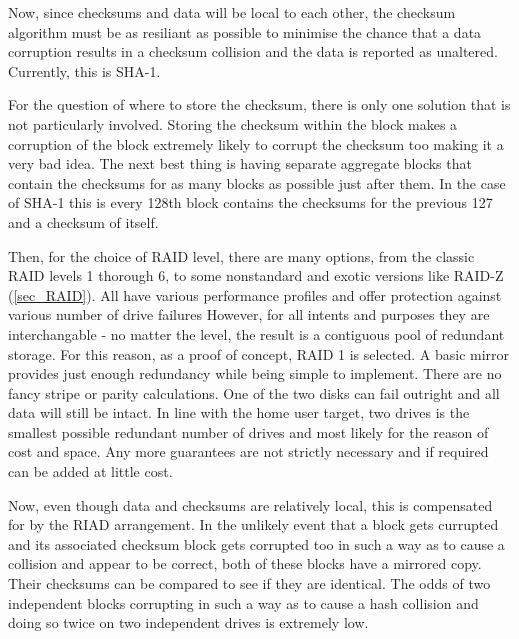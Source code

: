         Now, since checksums and data will be local to each other, the checksum
        algorithm must be as resiliant as possible to minimise the chance that
        a data corruption results in a checksum collision and the data is
        reported as unaltered. Currently, this is SHA-1.

        For the question of where to store the checksum, there is only one
        solution that is not particularly involved. Storing the checksum within
        the block makes a corruption of the block extremely likely to corrupt
        the checksum too making it a very bad idea. The next best thing is
        having separate aggregate blocks that contain the checksums for as many
        blocks as possible just after them. In the case of SHA-1 this is every
        128th block contains the checksums for the previous 127 and a checksum
        of itself.


        Then, for the choice of RAID level, there are many options, from the
        classic RAID levels 1 thorough 6, to some nonstandard and exotic
        versions like RAID-Z (\ref{sec_RAID}). All have various performance
        profiles and offer protection against various number of drive failures
        However, for all intents and purposes they are interchangable - no
        matter the level, the result is a contiguous pool of redundant storage.
        For this reason, as a proof of concept, RAID 1 is selected. A basic
        mirror provides just enough redundancy while being simple to implement.
        There are no fancy stripe or parity calculations. One of the two disks
        can fail outright and all data will still be intact.  In line with the
        home user target, two drives is the smallest possible redundant number
        of drives and most likely for the reason of cost and space. Any more
        guarantees are not strictly necessary and if required can be added at
        little cost.

        Now, even though data and checksums are relatively local, this is
        compensated for by the RIAD arrangement. In the unlikely event that a
        block gets currupted and its associated checksum block gets corrupted
        too in such a way as to cause a collision and appear to be correct,
        both of these blocks have a mirrored copy. Their checksums can be
        compared to see if they are identical. The odds of two independent
        blocks corrupting in such a way as to cause a hash collision and doing
        so twice on two independent drives is extremely low.
